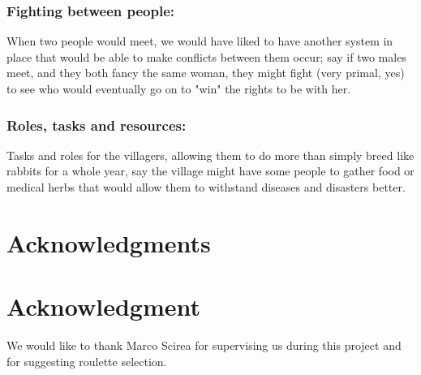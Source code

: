 \documentclass[conference,compsoc]{IEEEtran}
\begin{document}
\subsubsection*{Fighting between people:}
When two people would meet, we would have liked to have another system in place that would be able to make conflicts between them occur; say if two males meet, and they both fancy the same woman, they might fight (very primal, yes) to see who would eventually go on to "win" the rights to be with her.\\

\subsubsection*{Roles, tasks and resources:}
Tasks and roles for the villagers, allowing them to do more than simply breed like rabbits for a whole year, say the village might have some people to gather food or medical herbs that would allow them to withstand diseases and disasters better.\\


\newpage

\nocite{*} %
 


\ifCLASSOPTIONcompsoc
  \section*{Acknowledgments}
\else
  \section*{Acknowledgment}
\fi
We would like to thank Marco Scirea for supervising us during this project and for suggesting roulette selection.\\
\end{document}
